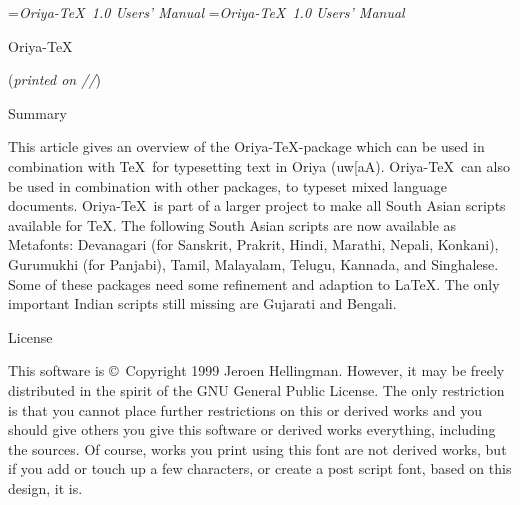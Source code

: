%
%



\setdoublecolumns{16cm}{24.6cm}{7.65cm}
\emergencystretch=30pt

\def\today{\number\day/\number\month/\number\year}

\rightheader={{\it Oriya-\TeX\ 1.0 Users' Manual}\hfill\folio}
\leftheader={\folio\hfill{\it Oriya-\TeX\ 1.0 Users' Manual}}

\voffset-1cm	%

\def\ortex{Oriya-\TeX}
\def\obrace{\char"7B}
\def\cbrace{\char"7D}

\parindent=0pt


\beginsection \ortex

({\it printed on \today\/})\medskip

\beginsection Summary

This article gives an overview of the \ortex-package which can be
used in combination with \TeX\ for typesetting text in Oriya 
({\or uw[\ornukta aA}). \ortex\ can also be used in combination with other
packages, to typeset mixed language
documents. \ortex\ is part of a larger project to make all South Asian scripts
available for \TeX. The following South Asian scripts are now available
as Metafonts: Devanagari (for Sanskrit, Prakrit, Hindi, Marathi, Nepali,
Konkani), Gurumukhi (for Panjabi), Tamil, Malayalam, Telugu, Kannada, and
Singhalese. Some of these packages need some refinement and adaption to
La\TeX. The only important Indian scripts still missing are Gujarati and Bengali.

\beginsection License

This software is \copyright\ Copyright 1999 Jeroen Hellingman. However, it may
be freely distributed in the spirit of the GNU General Public License. The only
restriction is that you cannot place further restrictions on this or derived works
and you should give others you give this software or derived works everything, 
including the sources. Of course, works you print using this font are not derived 
works, but if you add or touch up a few characters, or create a post script font, 
based on this design, it is.

